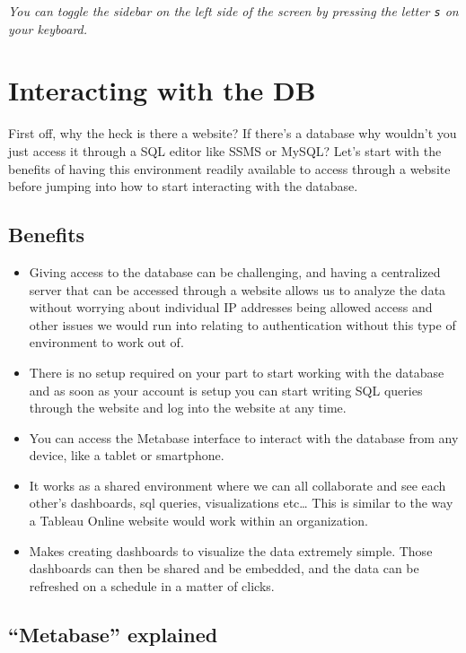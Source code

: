 \documentclass[
]{book}
\begin{document}
\emph{You can toggle the sidebar on the left side of the screen by pressing the letter \texttt{s} on your keyboard.}

\hypertarget{interacting-with-the-db}{%
\chapter{Interacting with the DB}\label{interacting-with-the-db}}

First off, why the heck is there a website? If there's a database why wouldn't you just access it through a SQL editor like SSMS or MySQL? Let's start with the benefits of having this environment readily available to access through a website before jumping into how to start interacting with the database.

\hypertarget{benefits}{%
\section{Benefits}\label{benefits}}

\begin{itemize}
\item
  Giving access to the database can be challenging, and having a centralized server that can be accessed through a website allows us to analyze the data without worrying about individual IP addresses being allowed access and other issues we would run into relating to authentication without this type of environment to work out of.
\item
  There is no setup required on your part to start working with the database and as soon as your account is setup you can start writing SQL queries through the website and log into the website at any time.
\item
  You can access the Metabase interface to interact with the database from any device, like a tablet or smartphone.
\item
  It works as a shared environment where we can all collaborate and see each other's dashboards, sql queries, visualizations etc\ldots{} This is similar to the way a Tableau Online website would work within an organization.
\item
  Makes creating dashboards to visualize the data extremely simple. Those dashboards can then be shared and be embedded, and the data can be refreshed on a schedule in a matter of clicks.
\end{itemize}

\hypertarget{metabase-explained}{%
\section{``Metabase'' explained}\label{metabase-explained}}
\end{document}
